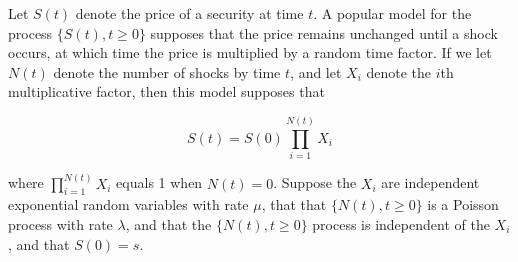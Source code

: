 \documentclass[10pt,a4paper]{exam}
\begin{document}
\begin{questions}
\question Let $S(t)$ denote the price of a security at time $t$. A popular model for the process $\{ S(t), t \geq 0 \}$ supposes that the price remains unchanged until a shock occurs, at which time the price is multiplied by a random time factor. If we let $N(t)$ denote the number of shocks by time $t$, and let $X_i$ denote the $i$th multiplicative factor, then this model supposes that

$$S(t) = S(0) \prod_{i=1}^{N(t)} X_i$$

where $\prod_{i=1}^{N(t)} X_i$ equals 1 when $N(t) = 0$. Suppose the $X_i$ are independent exponential random variables with rate $\mu$, that that $\{N(t), t \geq 0\}$ is a Poisson process with rate $\lambda$, and that the $\{N(t), t \geq 0\}$ process is independent of the $X_i$, and that $S(0) = s$.


\end{questions}
\end{document}
